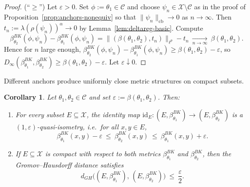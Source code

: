\documentclass[11pt]{amsart}
\newtheorem{corollary}[theorem]{Corollary}
\theoremstyle{definition}
\theoremstyle{remark}
\newcommand{\1}{\mathbbm{1}}
\newcommand{\id}{\mathrm{id}}
\newcommand{\cb}{\mathrm{cb}}
\begin{document}
\begin{proof}
\medskip
(``$\ge $'')
Let $\varepsilon>0$.
Set $\phi:=\theta_1\in \mathcal C$ and choose $\psi_n\in \mathcal X\setminus \mathcal C$ as in the proof of Proposition~\ref{prop:anchors-nonequiv} so that $\|\psi_n\|_{\cb}\to 0$ as $n\to\infty$.
Then $t_n:=\lambda(\rho(\psi_n))^\alpha\to 0$ by Lemma~\ref{lem:deltareg-basic}.
Compute
\[
\beta^{BK}_{\theta_2}(\phi,\psi_n)-\beta^{BK}_{\theta_1}(\phi,\psi_n)
=\bigl\|(\beta(\theta_1,\theta_2),t_n)\bigr\|_{\ell^p}-t_n
\ \xrightarrow[n\to\infty]{}\ \beta(\theta_1,\theta_2).
\]
Hence for $n$ large enough,
$\beta^{BK}_{\theta_2}(\phi,\psi_n)-\beta^{BK}_{\theta_1}(\phi,\psi_n)\ge \beta(\theta_1,\theta_2)-\varepsilon$,
so $D_\infty(\beta^{BK}_{\theta_1},\beta^{BK}_{\theta_2})\ge \beta(\theta_1,\theta_2)-\varepsilon$.
Let $\varepsilon\downarrow 0$.
\end{proof}
Different anchors produce uniformly close metric structures on compact subsets.
\begin{corollary}
\label{cor:rough-iso-GH}
Let $\theta_1,\theta_2\in \mathcal C$ and set $\varepsilon:=\beta(\theta_1,\theta_2)$.
Then:
\begin{enumerate}[label=\textup{(\roman*)}]
\item For every subset $E\subseteq \mathcal X$, the identity map $\id_E:(E,\beta^{BK}_{\theta_1})\to(E,\beta^{BK}_{\theta_2})$
is a $(1,\varepsilon)$-quasi-isometry, i.e.\ for all $x,y\in E$,
\[
\beta^{BK}_{\theta_1}(x,y)-\varepsilon\ \le\ \beta^{BK}_{\theta_2}(x,y)\ \le\ \beta^{BK}_{\theta_1}(x,y)+\varepsilon.
\]
\item If $E\subseteq \mathcal X$ is compact with respect to both metrics $\beta^{BK}_{\theta_1}$ and $\beta^{BK}_{\theta_2}$,
then the Gromov--Hausdorff distance satisfies
\[
d_{GH}\bigl((E,\beta^{BK}_{\theta_1}),\, (E,\beta^{BK}_{\theta_2})\bigr)\ \le\ \frac{\varepsilon}{2}.
\]
\end{enumerate}
\end{corollary}
\end{document}
